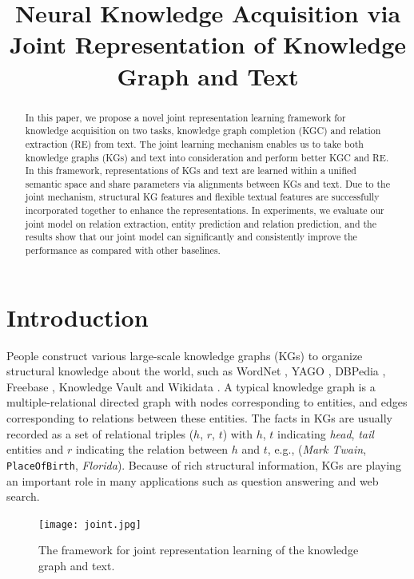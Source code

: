 \documentclass[11pt,a4paper]{article}
\title{Neural Knowledge Acquisition via Joint Representation of Knowledge Graph and Text}
\begin{document}
\maketitle

\begin{abstract}
   In this paper, we propose a novel joint representation learning framework for knowledge acquisition on two tasks, knowledge graph completion (KGC) and relation extraction (RE) from text. The joint learning mechanism enables us to take both knowledge graphs (KGs) and text into consideration and perform better KGC and RE. In this framework, representations of KGs and text are learned within a unified semantic space and share parameters via alignments between KGs and text. Due to the joint mechanism, structural KG features and flexible textual features are successfully incorporated together to enhance the representations. In experiments, we evaluate our joint model on relation extraction, entity prediction and relation prediction, and the results show that our joint model can significantly and consistently improve the performance as compared with other baselines. 
\end{abstract}


\section{Introduction}
\label{intro}

People construct various large-scale knowledge graphs (KGs) to organize structural knowledge about the world, such as WordNet \cite{miller1995wordnet}, YAGO \cite{suchanek2007yago}, DBPedia \cite{auer2007dbpedia}, Freebase \cite{bollacker2008freebase}, Knowledge Vault \cite{dong2014knowledge} and Wikidata \cite{vrandevcic2014wikidata}. A typical knowledge graph is a multiple-relational directed graph with nodes corresponding to entities, and edges corresponding to relations between these entities. The facts in KGs are usually recorded as a set of relational triples ($h$, $r$, $t$) with $h$, $t$ indicating \emph{head}, \emph{tail} entities and $r$ indicating the relation between $h$ and $t$, e.g., (\emph{Mark Twain}, \texttt{PlaceOfBirth}, \emph{Florida}). Because of rich structural information, KGs are playing an important role in many applications such as question answering and web search.

\begin{figure}[]
\centering
\texttt{[image: joint.jpg]}
\caption{The framework for joint representation learning of the knowledge graph and text.}
\label{fig:joinglearning}
\end{figure}
\end{document}
